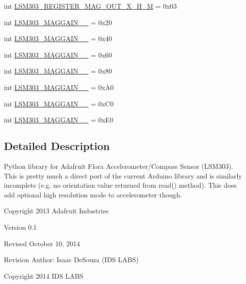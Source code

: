 \begin{DoxyCompactItemize}
int \hyperlink{classdriver_1_1DRIVER__CORE_1_1Adafruit__LSM303_a39399d95adf47130963ad6228b41f5b5}{L\+S\+M303\+\_\+\+R\+E\+G\+I\+S\+T\+E\+R\+\_\+\+M\+A\+G\+\_\+\+O\+U\+T\+\_\+\+X\+\_\+\+H\+\_\+\+M} = 0x03
\item 
int \hyperlink{classdriver_1_1DRIVER__CORE_1_1Adafruit__LSM303_a7f838baa79a6ae3da80e428f07c0b9ae}{L\+S\+M303\+\_\+\+M\+A\+G\+G\+A\+I\+N\+\_\+\_} = 0x20
\item 
int \hyperlink{classdriver_1_1DRIVER__CORE_1_1Adafruit__LSM303_a895624eb31381290c41eb4ba15762a21}{L\+S\+M303\+\_\+\+M\+A\+G\+G\+A\+I\+N\+\_\+\_} = 0x40
\item 
int \hyperlink{classdriver_1_1DRIVER__CORE_1_1Adafruit__LSM303_a690a2ccf1305ddb8e369e42e140a3d9e}{L\+S\+M303\+\_\+\+M\+A\+G\+G\+A\+I\+N\+\_\+\_} = 0x60
\item 
int \hyperlink{classdriver_1_1DRIVER__CORE_1_1Adafruit__LSM303_aabf347d0927ecaea47e318cc804e10a0}{L\+S\+M303\+\_\+\+M\+A\+G\+G\+A\+I\+N\+\_\+\_} = 0x80
\item 
int \hyperlink{classdriver_1_1DRIVER__CORE_1_1Adafruit__LSM303_a1875f919180b6da6408c2d005bb8bdad}{L\+S\+M303\+\_\+\+M\+A\+G\+G\+A\+I\+N\+\_\+\_} = 0x\+A0
\item 
int \hyperlink{classdriver_1_1DRIVER__CORE_1_1Adafruit__LSM303_a9dfa52c66b43d044d18e642243a4c15d}{L\+S\+M303\+\_\+\+M\+A\+G\+G\+A\+I\+N\+\_\+\_} = 0x\+C0
\item 
int \hyperlink{classdriver_1_1DRIVER__CORE_1_1Adafruit__LSM303_a4c33c59d6577266becd976da47b46e7c}{L\+S\+M303\+\_\+\+M\+A\+G\+G\+A\+I\+N\+\_\+\_} = 0x\+E0
\end{DoxyCompactItemize}


\subsection{Detailed Description}
\begin{DoxyVerb}Python library for Adafruit Flora Accelerometer/Compass Sensor (LSM303).
This is pretty much a direct port of the current Arduino library and is
similarly incomplete (e.g. no orientation value returned from read()
method).  This does add optional high resolution mode to accelerometer
though.

Copyright 2013 Adafruit Industries

Version 0.1

Revised October 10, 2014

Revision Author: Isaac DeSouza (IDS LABS)

Copyright 2014 IDS LABS
\end{DoxyVerb}
 

